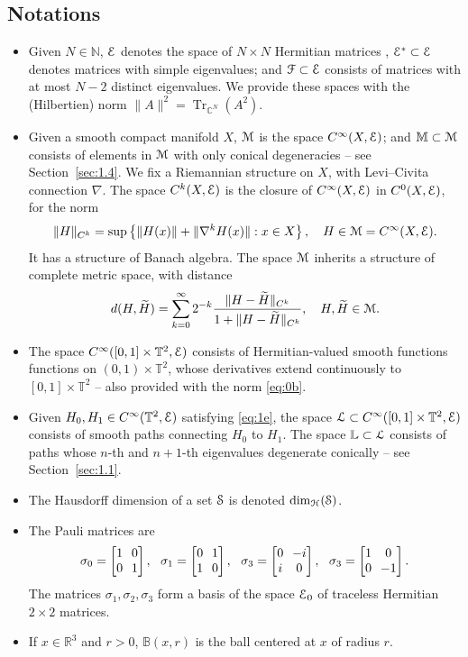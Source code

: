 \documentclass[11pt]{article}
\newcommand{\Subsection}{\subsection}
\numberwithin{equation}{section}
\let\pazocal\EuScript
\let\sep:
\theoremstyle{definition}
\DeclareMathOperator{\Tr}{Tr}
\newcommand{\FF}{\pazocal{F}}
\newcommand{\EE}{\pazocal{E}}
\newcommand{\MM}{\pazocal{M}}
\newcommand{\LL}{{\pazocal{L}}}
\newcommand{\HH}{\pazocal{H}}
\newcommand{\SSS}{{\pazocal{S}}}
\newcommand{\Bb}{\mathbb{B}}
\newcommand{\C}{\mathbb{C}}
\newcommand{\Ll}{\mathbb{L}}
\newcommand{\R}{\mathbb{R}}
\newcommand{\N}{\mathbb{N}}
\newcommand{\Mm}{\mathbb{M}}
\newcommand{\Tt}{{\mathbb{T}}}
\newcommand{\tH}{{\widetilde{H}}}
\newcommand{\matrice}[1]{\arraycolsep3.5pt\begin{bmatrix}#1\end{bmatrix}}
\begin{document}
\Subsection{Notations}\label{sec:1.6}
\begin{itemize}
\item Given $N \in \N$, $\EE$ denotes the space of $N \times N$ Hermitian matrices , $\EE^* \subset \EE$ denotes matrices with simple eigenvalues; and $\FF \subset \EE$ consists of matrices with at most $N-2$ distinct eigenvalues. We provide these spaces with the (Hilbertien) norm $\|A\|^2 = \Tr_{\C^N}(A^2)$.
\item Given a smooth compact manifold $X$, $\MM$ is the space $C^\infty(X,\EE)$; and $\Mm \subset \MM$ consists of elements in $\MM$ with only conical degeneracies -- see Section~\ref{sec:1.4}. We fix a Riemannian structure on $X$, with Levi--Civita connection $\nabla$. The space $C^k(X,\EE)$ is the closure of $C^\infty(X,\EE)$ in $C^0(X,\EE)$, for the norm
\begin{equation*}
\| H \|_{C^k} = \sup \left\{\| H(x)\| +\| \nabla^k H(x)\|\sep x \in X \right\}, \quad H \in \MM = C^\infty(X,\EE).
\end{equation*}
It has a structure of Banach algebra. The space $\MM$ inherits a structure of complete metric space, with distance
\begin{equation}\label{eq:0b}
d(H,\tH) = \sum_{k=0}^\infty 2^{-k} \dfrac{\| H-\tH \|_{C^k}}{1+\| H-\tH \|_{C^k}}, \quad H, \tH \in \MM.
\end{equation}
\item The space $C^\infty([0,1] \times \Tt^2,\EE)$ consists of Hermitian-valued smooth functions functions on $(0,1) \times \Tt^2$, whose derivatives extend continuously to $[0,1] \times \Tt^2$ -- also provided with the norm \eqref{eq:0b}.
\item Given $H_0, H_1 \in C^\infty(\Tt^2, \EE)$ satisfying \eqref{eq:1e}, the space $\LL \subset C^\infty([0,1] \times \Tt^2,\EE)$ consists of smooth paths connecting $H_0$ to $H_1$. The space $\Ll \subset \LL$ consists of paths whose $n$-th and $n+1$-th eigenvalues degenerate conically -- see Section~\ref{sec:1.1}.
\item The Hausdorff dimension of a set $\SSS$ is denoted $\dim_\HH(\SSS)$.
\item The Pauli matrices are
\begin{equation*}
\sigma_0 = \matrice{1 & 0 \\ 0 & 1}, \ \ \sigma_1 = \matrice{0 & 1 \\ 1 & 0}, \ \ \sigma_3 = \matrice{0 & -i \\ i & 0}, \ \ \sigma_3 = \matrice{1 & 0 \\ 0 & -1}.
\end{equation*}
The matrices $\sigma_1, \sigma_2, \sigma_3$ form a basis of the space $\EE_0$ of traceless Hermitian $2 \times 2$ matrices.
\item If $x \in \R^3$ and $r > 0$, $\Bb(x,r)$ is the ball centered at $x$ of radius $r$.
\end{itemize}
\end{document}
